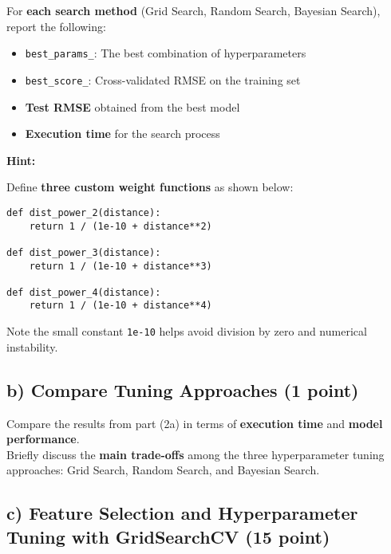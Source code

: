 \documentclass[
  letterpaper,
  DIV=11,
  numbers=noendperiod]{scrreprt}
\providecommand{\tightlist}{%
  \setlength{\itemsep}{0pt}\setlength{\parskip}{0pt}}\usepackage{longtable,booktabs,array}
\begin{document}
For \textbf{each search method} (Grid Search, Random Search, Bayesian
Search), report the following:

\begin{itemize}
\tightlist
\item
  \texttt{best\_params\_}: The best combination of hyperparameters\\
\item
  \texttt{best\_score\_}: Cross-validated RMSE on the training set\\
\item
  \textbf{Test RMSE} obtained from the best model\\
\item
  \textbf{Execution time} for the search process
\end{itemize}

\textbf{Hint:}

Define \textbf{three custom weight functions} as shown below:

\begin{verbatim}
def dist_power_2(distance):
    return 1 / (1e-10 + distance**2)

def dist_power_3(distance):
    return 1 / (1e-10 + distance**3)

def dist_power_4(distance):
    return 1 / (1e-10 + distance**4)
\end{verbatim}

Note the small constant \texttt{1e-10} helps avoid division by zero and
numerical instability.

\subsection{\texorpdfstring{b) Compare Tuning Approaches \textbf{(1
point)}}{b) Compare Tuning Approaches (1 point)}}\label{b-compare-tuning-approaches-1-point}

Compare the results from part (2a) in terms of \textbf{execution time}
and \textbf{model performance}.\\
Briefly discuss the \textbf{main trade-offs} among the three
hyperparameter tuning approaches: Grid Search, Random Search, and
Bayesian Search.

\subsection{\texorpdfstring{c) Feature Selection and Hyperparameter
Tuning with GridSearchCV \textbf{(15
point)}}{c) Feature Selection and Hyperparameter Tuning with GridSearchCV (15 point)}}\label{c-feature-selection-and-hyperparameter-tuning-with-gridsearchcv-15-point}
\end{document}
